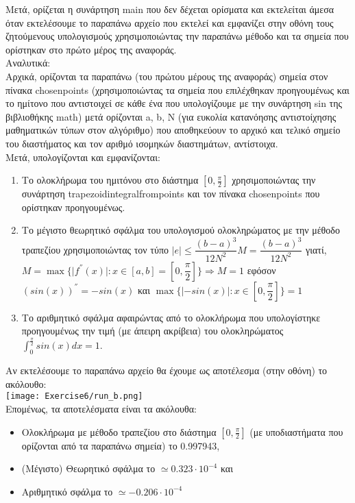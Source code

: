 \documentclass[a4paper,11pt]{article}
\newcommand{\lt}{\latintext}
\begin{document}
\par
Μετά, ορίζεται η συνάρτηση {\lt main} που δεν δέχεται ορίσματα και εκτελείται άμεσα όταν εκτελέσουμε το παραπάνω αρχείο που εκτελεί και εμφανίζει στην οθόνη τους ζητούμενους υπολογισμούς χρησιμοποιώντας την παραπάνω μέθοδο και τα σημεία που ορίστηκαν στο πρώτο μέρος της αναφοράς.\\
Αναλυτικά:\\
Αρχικά, ορίζονται τα παραπάνω (του πρώτου μέρους της αναφοράς) σημεία στον πίνακα {\lt chosen\textunderscore points} (χρησιμοποιώντας τα σημεία που επιλέχθηκαν προηγουμένως και το ημίτονο που αντιστοιχεί σε κάθε ένα που υπολογίζουμε με την συνάρτηση {\lt sin} της βιβλιοθήκης {\lt math}) μετά ορίζονται {\lt a, b, N} (για ευκολία κατανόησης αντιστοίχησης μαθηματικών τύπων στον αλγόριθμο) που αποθηκεύουν το αρχικό και τελικό σημείο του διαστήματος και τον αριθμό ισομηκών διαστημάτων, αντίστοιχα.\\
Μετά, υπολογίζονται και εμφανίζονται:
\begin{enumerate}
    \item Το ολοκλήρωμα του ημιτόνου στο διάστημα $[0, \frac{\pi}{2}]$ χρησιμοποιώντας την συνάρτηση {\lt trapezoid\textunderscore integral\textunderscore from\textunderscore points} και τον πίνακα {\lt chosen\textunderscore points} που ορίστηκαν προηγουμένως.
    \item Το μέγιστο θεωρητικό σφάλμα του υπολογισμού ολοκληρώματος με την μέθοδο τραπεζίου χρησιμοποιώντας τον τύπο {\lt $\lvert e\rvert \leq \dfrac{(b-a)^3}{12N^2}M =\dfrac{(b-a)^3}{12N^2}$} γιατί, {\lt $M = \max\{ \lvert f^{''}(x)\rvert : x \in [a, b] = [0,\dfrac{\pi}{2}]\} \Longrightarrow M = 1$} εφόσον {\lt $(sin(x))^{''} = -sin(x)$} και {\lt $\max\{ \lvert -sin(x)\rvert : x \in [0,\dfrac{\pi}{2}]\} = 1$ }
    \item Το αριθμητικό σφάλμα αφαιρώντας από το ολοκλήρωμα που υπολογίστηκε προηγουμένως την τιμή (με άπειρη ακρίβεια) του ολοκληρώματος {\lt $\int_{0}^{\frac{\pi}{2}}sin(x)dx = 1$}.
\end{enumerate}

\par
Αν εκτελέσουμε το παραπάνω αρχείο θα έχουμε ως αποτέλεσμα (στην οθόνη) το ακόλουθο:\\
\texttt{[image: Exercise6/run\_b.png]}\\

Επομένως, τα αποτελέσματα είναι τα ακόλουθα:
\begin{itemize}
    \item Ολοκλήρωμα με μέθοδο τραπεζίου στο διάστημα $[0, \frac{\pi}{2}]$ (με υποδιαστήματα που ορίζονται από τα παραπάνω σημεία) το 0.997943,
    \item (Μέγιστο) Θεωρητικό σφάλμα το $\simeq 0.323\cdot 10^{-4}$ και
    \item Αριθμητικό σφάλμα το $\simeq -0.206\cdot 10^{-4}$
\end{itemize}
\end{document}

